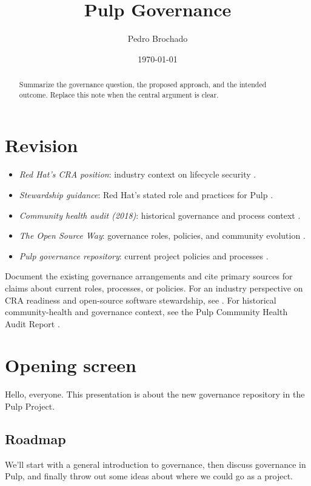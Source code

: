 \documentclass[11pt]{article}
\title{Pulp Governance}
\author{Pedro Brochado}
\date{\today}
\newcommand{\nextslide}{%
  \par\smallskip\noindent\fbox{\textsf{\small Switch slides}}\par\smallskip
}
\begin{document}
\maketitle

\begin{abstract}
  Summarize the governance question, the proposed approach, and the intended
  outcome. Replace this note when the central argument is clear.
\end{abstract}

\section{Revision}
\begin{itemize}
  \item \emph{Red Hat's CRA position}: industry context on lifecycle security \cite{redhat-cra}.
  \item \emph{Stewardship guidance}: Red Hat's stated role and practices for Pulp \cite{redhat-cra-steward}.
  \item \emph{Community health audit (2018)}: historical governance and process context \cite{pulp-health-audit}.
  \item \emph{The Open Source Way}: governance roles, policies, and community evolution \cite{open-source-way-governance}.
  \item \emph{Pulp governance repository}: current project policies and processes \cite{pulp-governance-repo}.
\end{itemize}

Document the existing governance arrangements and cite primary sources for
claims about current roles, processes, or policies. For an industry perspective
on CRA readiness and open-source software stewardship, see \cite{redhat-cra,
redhat-cra-steward}. For historical community-health and governance context,
see the Pulp Community Health Audit Report \cite{pulp-health-audit}.


\section{Opening screen}

Hello, everyone. This presentation is about the new governance repository in the Pulp Project.

\nextslide
\subsection{Roadmap}
We'll start with a general introduction to governance,
then discuss governance in Pulp,
and finally throw out some ideas about where we could go as a project.
\end{document}
